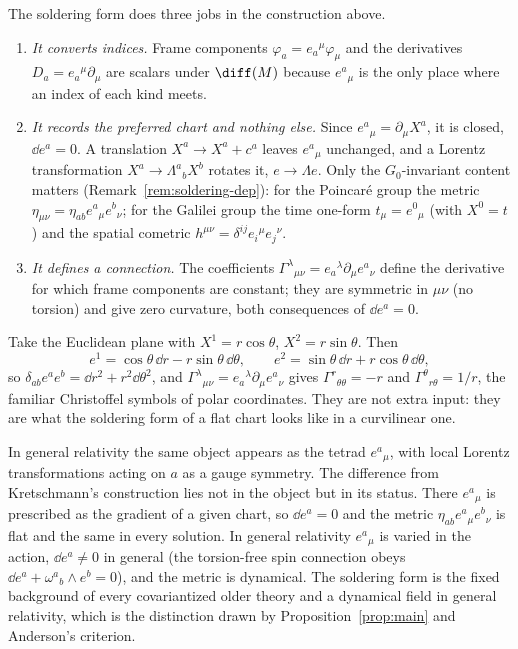 The soldering form does three jobs in the construction above.
\begin{enumerate}[leftmargin=1.8em,itemsep=3pt,label=\textbf{\arabic*.}]
\item \emph{It converts indices.} Frame components $\varphi_a=e_a{}^\mu\varphi_\mu$
  and the derivatives $D_a=e_a{}^\mu\partial_\mu$ are scalars under
  $\diff(M)$ because $e^a{}_\mu$ is the only place where an index of each kind
  meets.
\item \emph{It records the preferred chart and nothing else.} Since
  $e^a{}_\mu=\partial_\mu X^a$, it is closed, $\dd e^a=0$. A translation
  $X^a\to X^a+c^a$ leaves $e^a{}_\mu$ unchanged, and a Lorentz transformation
  $X^a\to\Lambda^a{}_bX^b$ rotates it, $e\to\Lambda e$. Only the
  $G_0$-invariant content matters (Remark~\ref{rem:soldering-dep}): for the
  Poincar\'e group the metric $\eta_{\mu\nu}=\eta_{ab}e^a{}_\mu e^b{}_\nu$; for
  the Galilei group the time one-form $t_\mu=e^0{}_\mu$ (with $X^0=t$) and the
  spatial cometric $h^{\mu\nu}=\delta^{ij}e_i{}^\mu e_j{}^\nu$.
\item \emph{It defines a connection.} The coefficients
  $\Gamma^\lambda{}_{\mu\nu}=e_a{}^\lambda\partial_\mu e^a{}_\nu$ define the
  derivative for which frame components are constant; they are symmetric in
  $\mu\nu$ (no torsion) and give zero curvature, both consequences of
  $\dd e^a=0$.
\end{enumerate}

\begin{example}\label{ex:polar}
Take the Euclidean plane with $X^1=r\cos\theta$, $X^2=r\sin\theta$. Then
\begin{equation}
  e^1=\cos\theta\,\dd r-r\sin\theta\,\dd\theta,\qquad
  e^2=\sin\theta\,\dd r+r\cos\theta\,\dd\theta,
\end{equation}
so $\delta_{ab}e^a e^b=\dd r^2+r^2\dd\theta^2$, and
$\Gamma^\lambda{}_{\mu\nu}=e_a{}^\lambda\partial_\mu e^a{}_\nu$ gives
$\Gamma^r{}_{\theta\theta}=-r$ and $\Gamma^\theta{}_{r\theta}=1/r$, the familiar
Christoffel symbols of polar coordinates. They are not extra input: they are
what the soldering form of a flat chart looks like in a curvilinear one.
\end{example}

In general relativity the same object appears as the tetrad $e^a{}_\mu$, with
local Lorentz transformations acting on $a$ as a gauge symmetry. The
difference from Kretschmann's construction lies not in the object but in its
status. There $e^a{}_\mu$ is prescribed as the gradient of a given chart, so
$\dd e^a=0$ and the metric $\eta_{ab}e^a{}_\mu e^b{}_\nu$ is flat and the same
in every solution. In general relativity $e^a{}_\mu$ is varied in the action,
$\dd e^a\neq0$ in general (the torsion-free spin connection obeys
$\dd e^a+\omega^a{}_b\wedge e^b=0$), and the metric is dynamical. The
soldering form is the fixed background of every covariantized older theory and
a dynamical field in general relativity, which is the distinction drawn by
Proposition~\ref{prop:main} and Anderson's criterion.

